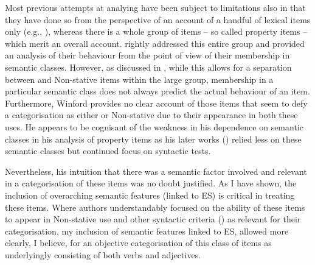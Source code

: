 Most previous attempts at analying  have been subject to limitations also in that they have done so from the perspective of an account of a handful of lexical items only (e.g., \citealt{Sebba1986,Seuren1986}), whereas there is a whole group of items -- so called property items -- which merit an overall account. \citet{Winford1993} rightly addressed this entire group and provided an analysis of their behaviour from the point of view of their membership in semantic classes. However, as discussed in , while this allows for a separation between  and Non-stative items within the large group, membership in a particular semantic class does not always predict the actual behaviour of an item. Furthermore, Winford provides no clear account of those items that seem to defy a categorisation as either  or Non-stative due to their appearance in both these uses. He appears to be cognisant of the weakness in his dependence on semantic classes in his analysis of property items as his later works (\citeyear{Winford1997,Winford2001}) relied less on these semantic classes but continued focus on syntactic tests. 

Nevertheless, his intuition that there was a semantic factor involved and relevant in a categorisation of these items was no doubt justified. As I have shown, the inclusion of overarching semantic features (linked to ES) is critical in treating these items. Where authors understandably focused on the ability of these items to appear in Non-stative use and other syntactic criteria () as relevant for their categorisation, my inclusion of semantic features linked to ES, allowed more clearly, I believe, for an objective categorisation of this class of items as underlyingly consisting of both verbs and adjectives.\largerpage

